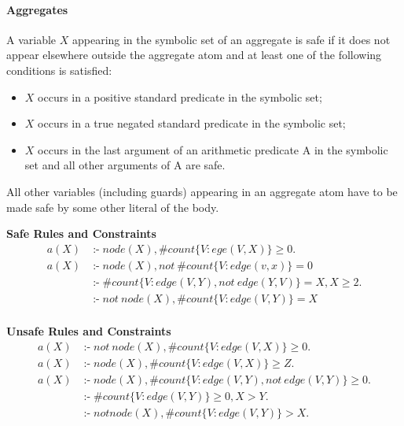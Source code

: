 \documentclass[a4paper, titlepage]{article}
\DeclareMathOperator{\leftimpl}{:-}
\begin{document}
\paragraph{Aggregates}
A variable $X$ appearing in the symbolic set of an aggregate is safe if it does not appear elsewhere outside the aggregate atom and at least one of the following conditions is satisfied:
\begin{itemize}
\item $X$ occurs in a positive standard predicate in the symbolic set;
\item $X$ occurs in a true negated standard predicate in the symbolic set;
\item $X$ occurs in the last argument of an arithmetic predicate A in the symbolic set and all other arguments of A are safe.
\end{itemize}
All other variables (including guards) appearing in an aggregate atom have to be made safe by some other literal of the body.
\begin{exmp} \textbf{Safe Rules and Constraints}
\begin{align*}
a(X) & \leftimpl node(X), \#count\{ V \colon ege(V,X)\} \geq 0. \\
a(X) & \leftimpl node(X), not \ \#count\{ V \colon edge(v,x)\} = 0\\
& \leftimpl \#count\{V \colon edge(V,Y), not \ edge(Y,V)\}=X, X\geq2.\\
& \leftimpl not \ node(X), \#count\{ V \colon edge(V,Y)\}=X\\
\end{align*}
\end{exmp}

\begin{exmp} \textbf{Unsafe Rules and Constraints}
\begin{align*}
a(X) & \leftimpl not \ node(X), \#count\{V \colon edge(V,X)\} \geq 0. \\
a(X) & \leftimpl node(X), \#count\{V \colon edge(V,X)\} \geq Z. \\
a(X) & \leftimpl node(X), \#count\{V \colon edge(V,Y), not \ edge(V,Y)\} \geq 0. \\
& \leftimpl \#count\{ V \colon edge(V,Y)\} \geq 0, X > Y. \\
& \leftimpl not node(X), \#count\{V \colon edge(V,Y)\} > X. 
\end{align*}
\end{exmp}
\end{document}
